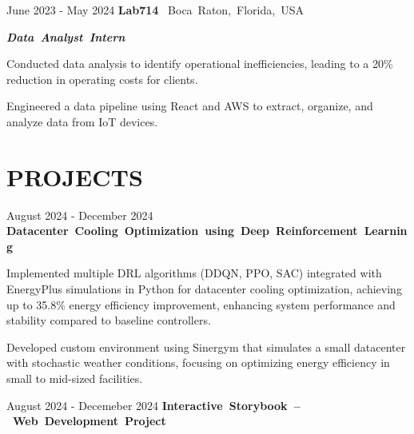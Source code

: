 \documentclass[10pt, letterpaper]{article}
\begin{document}
\vspace{\entrySpacing}
\begin{twocolentry}{June 2023 - May 2024}
    \mbox{\textbf{Lab714}
        \kern {}
        \AND
        \kern {}}
    \mbox{Boca Raton, Florida, USA}
\end{twocolentry}

\mbox{\textbf{\textsl{Data Analyst Intern}}}
\begin{onecolentry}
    \begin{highlightsforbulletentries}
        \item Conducted data analysis to identify operational inefficiencies, leading to a 20\% reduction in operating costs for clients.
        \item Engineered a data pipeline using React and AWS to extract, organize, and analyze data from IoT devices.
    \end{highlightsforbulletentries}
\end{onecolentry}

\vspace{\headerSpacing}
\section{PROJECTS}

\vspace{\entrySpacing}
\begin{twocolentry}{August 2024 - December 2024}
    \mbox{\textbf{Datacenter Cooling Optimization using Deep Reinforcement Learning}}
\end{twocolentry}

\begin{onecolentry}
    \begin{highlightsforbulletentries}
        \item Implemented multiple DRL algorithms (DDQN, PPO, SAC) integrated with EnergyPlus simulations in Python for datacenter cooling optimization, achieving up to 35.8\% energy efficiency improvement, enhancing system performance and stability compared to baseline controllers.
        \item Developed custom environment using Sinergym that simulates a small datacenter with stochastic weather conditions, focusing on optimizing energy efficiency in small to mid-sized facilities.
    \end{highlightsforbulletentries}
\end{onecolentry}

\vspace{\entrySpacing}
\begin{twocolentry}{August 2024 - Decemeber 2024}
    \mbox{\textbf{Interactive Storybook -- Web Development Project}}
\end{twocolentry}
\end{document}
